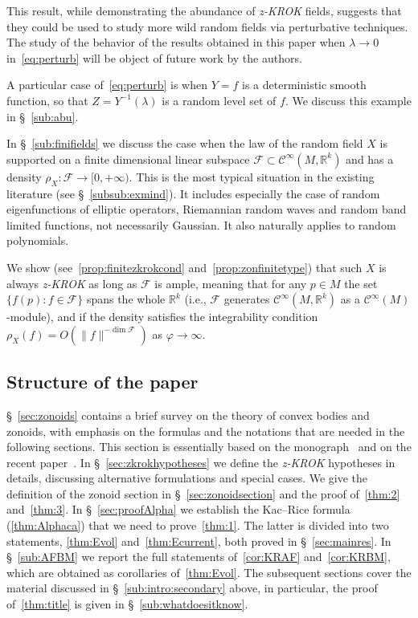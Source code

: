 \documentclass[AHL, Unicode, longabstracts, published]{cedram}
\newcommand{\R}{\mathbb{R}}
\newcommand{\F}{\mathcal{F}}
\newcommand{\mC}{\mathcal{C}}
\newcommand{\zkrok}{\emph{z-KROK}\xspace}
\newcommand{\f}{\varphi}
\begin{document}
This result, while demonstrating the abundance of {\zkrok} fields, suggests that they could be used to study more wild random fields via perturbative techniques. The study of the behavior of the results obtained in this paper when $\lambda\to 0$ in~\eqref{eq:perturb} will be object of future work by the authors.

A particular case of~\eqref{eq:perturb} is when $Y=f$ is a deterministic smooth function, so that $Z=Y^{-1}(\lambda)$ is a random level set of $f$. We discuss this example in \S~\ref{sub:abu}.

In \S~\ref{sub:finifields} we discuss the case when the law of the random field $X$ is supported on a finite dimensional linear subspace $\F\subset \mC^\infty(M,\R^k)$ and has a density $\rho_X\colon \F\to [0,+\infty)$. This is the most typical situation in the existing literature (see \S~\ref{subsub:exmind}). It includes especially the case of random eigenfunctions of elliptic operators, Riemannian random waves and random band limited functions, not necessarily Gaussian. It also naturally applies to random polynomials.

We show (see~\cref{prop:finitezkrokcond} and~\cref{prop:zonfinitetype}) that such $X$ is always {\zkrok} as long as $\F$ is ample, meaning that for any $p\in M$ the set $\{f(p)\colon f\in\F\}$ spans the whole $\R^k$ (i.e., $\F$ generates $\mC^\infty(M,\R^k)$ as a $\mC^\infty(M)$-module), and if the density satisfies the integrability condition $\rho_X(f)=O(\|f\|^{-\dim \F})$ as $\f\to\infty$.


\subsection{Structure of the paper}

\S~\ref{sec:zonoids} contains a brief survey on the theory of convex bodies and zonoids, with emphasis on the formulas and the notations that are needed in the following sections. This section is essentially based on the monograph~\cite{bible} and on the recent paper~\cite{ZA}. In \S~\ref{sec:zkrokhypotheses} we define the {\zkrok} hypotheses in details, discussing alternative formulations and special cases. We give the definition of the zonoid section in \S~\ref{sec:zonoidsection} and the proof of~\cref{thm:2} and~\cref{thm:3}. In \S~\ref{sec:proofAlpha} we establish the Kac--Rice formula (\cref{thm:Alphaca}) that we need to prove~\cref{thm:1}. The latter is divided into two statements, \cref{thm:Evol} and~\cref{thm:Ecurrent}, both proved in \S~\ref{sec:mainres}. In \S~\ref{sub:AFBM} we report the full statements of~\cref{cor:KRAF} and~\cref{cor:KRBM}, which are obtained as corollaries of~\cref{thm:Evol}. The subsequent sections cover the material discussed in \S~\ref{sub:intro:secondary} above, in particular, the proof of~\cref{thm:title} is given in \S~\ref{sub:whatdoesitknow}.
\end{document}

